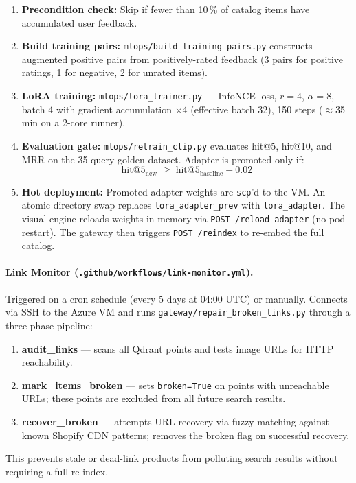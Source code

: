 \documentclass[12pt]{article}
\begin{document}
\begin{enumerate}[leftmargin=*]
  \item \textbf{Precondition check:} Skip if fewer than 10\,\% of catalog items have accumulated user feedback.
  \item \textbf{Build training pairs:} \texttt{mlops/build\_training\_pairs.py} constructs augmented positive pairs from positively-rated feedback (3 pairs for positive ratings, 1 for negative, 2 for unrated items).
  \item \textbf{LoRA training:} \texttt{mlops/lora\_trainer.py} --- InfoNCE loss, $r=4$, $\alpha=8$, batch 4 with gradient accumulation $\times$4 (effective batch 32), 150 steps ($\approx$35\,min on a 2-core runner).
  \item \textbf{Evaluation gate:} \texttt{mlops/retrain\_clip.py} evaluates hit@5, hit@10, and MRR on the 35-query golden dataset. Adapter is promoted only if:
  \[
    \text{hit@5}_{\text{new}} \;\ge\; \text{hit@5}_{\text{baseline}} - 0.02
  \]
  \item \textbf{Hot deployment:} Promoted adapter weights are \texttt{scp}'d to the VM. An atomic directory swap replaces \texttt{lora\_adapter\_prev} with \texttt{lora\_adapter}. The visual engine reloads weights in-memory via \texttt{POST /reload-adapter} (no pod restart). The gateway then triggers \texttt{POST /reindex} to re-embed the full catalog.
\end{enumerate}

\paragraph{Link Monitor (\texttt{.github/workflows/link-monitor.yml}).}
Triggered on a cron schedule (every 5 days at 04:00 UTC) or manually. Connects via SSH to the Azure VM and runs \texttt{gateway/repair\_broken\_links.py} through a three-phase pipeline:
\begin{enumerate}[leftmargin=*]
  \item \textbf{audit\_links} --- scans all Qdrant points and tests image URLs for HTTP reachability.
  \item \textbf{mark\_items\_broken} --- sets \texttt{broken=True} on points with unreachable URLs; these points are excluded from all future search results.
  \item \textbf{recover\_broken} --- attempts URL recovery via fuzzy matching against known Shopify CDN patterns; removes the broken flag on successful recovery.
\end{enumerate}
This prevents stale or dead-link products from polluting search results without requiring a full re-index.
\end{document}
